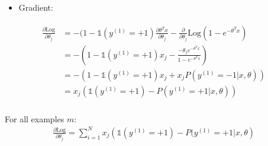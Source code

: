 \documentclass[a4paper,12pt]{report}
\begin{document}
\begin{appendices}
\begin{itemize}
\item Gradient:
\end{itemize}
\begin{align}
\begin{split}
\frac{\partial{\mathrm{Log}}}{\partial \theta_j} &= -(1-\mathds{1}(y^{(1)}=+1) \frac{\partial \theta^T x}{\partial \theta_j} - \frac{\partial}{\partial \theta_j} \mathrm{Log}\left(1-e^{-\theta^T x} \right) \\
&= -(1-\mathds{1}(y^{(1)}=+1) x_j - \frac{-\theta_j e^{-\theta^T x}}{1-e^{-\theta^T x}}) \\
&=-(1-\mathds{1}(y^{(1)}=+1) x_j + x_j P(y^{(1)}=-1|x,\theta ) )\\
&=x_j \left( \mathds{1}(y^{(1)}=+1) - P(y^{(1)}=+1|x,\theta) \right)\\
\end{split}
\end{align}

For all examples $m$:
\begin{align}
\frac{\partial{\mathrm{Log}}}{\partial \theta_j} = \sum_{i=1} ^{N} x_j \left( \mathds{1}(y^{(1)}=+1) - P(y^{(1)}=+1|x,\theta \right)
\end{align}
\end{appendices}
\end{document}
